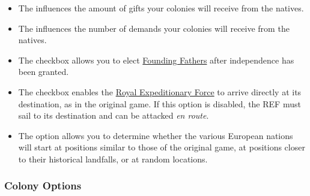 \documentclass[12pt]{book}
\begin{document}
\begin{itemize}
\item The  influences the amount of gifts
  your colonies will receive from the natives.

\item The  influences the number of demands
  your colonies will receive from the natives.

\item The checkbox 
  allows you to elect \hyperlink{Founding Fathers}{Founding Fathers}
  after independence has been granted.

\item The checkbox  enables the \hyperlink{Royal
  Expeditionary Force}{Royal Expeditionary Force} to arrive directly
  at its destination, as in the original game. If this option is
  disabled, the REF must sail to its destination and can be attacked
  {\it en route}.

\item The option  allows you to determine
  whether the various European nations will start at positions similar
  to those of the original game, at positions closer to their
  historical landfalls, or at random locations.

\end{itemize}

\hypertarget{colony options}{\subsubsection{Colony Options}}
\end{document}
